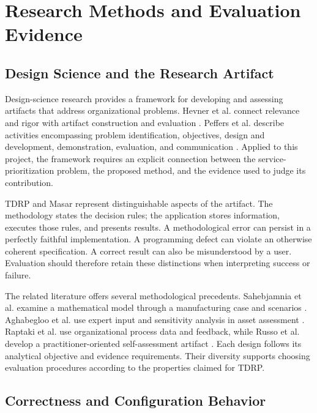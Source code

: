 \section{Research Methods and Evaluation Evidence}
\label{sec:lr_methods}

\subsection{Design Science and the Research Artifact}
\label{sec:lr_design_science}

Design-science research provides a framework for developing and assessing artifacts that address organizational problems. Hevner et al. connect relevance and rigor with artifact construction and evaluation \cite{hevner2004design}. Peffers et al. describe activities encompassing problem identification, objectives, design and development, demonstration, evaluation, and communication \cite{peffers2007dsrm}. Applied to this project, the framework requires an explicit connection between the service-prioritization problem, the proposed method, and the evidence used to judge its contribution.

TDRP and Masar represent distinguishable aspects of the artifact. The methodology states the decision rules; the application stores information, executes those rules, and presents results. A methodological error can persist in a perfectly faithful implementation. A programming defect can violate an otherwise coherent specification. A correct result can also be misunderstood by a user. Evaluation should therefore retain these distinctions when interpreting success or failure.

The related literature offers several methodological precedents. Sahebjamnia et al. examine a mathematical model through a manufacturing case and scenarios \cite{sahebjamnia2015integrated}. Aghabegloo et al. use expert input and sensitivity analysis in asset assessment \cite{assetcriticality2023}. Raptaki et al. use organizational process data and feedback, while Russo et al. develop a practitioner-oriented self-assessment artifact \cite{raptaki2025propagation,selfassessment2025}. Each design follows its analytical objective and evidence requirements. Their diversity supports choosing evaluation procedures according to the properties claimed for TDRP.

\subsection{Correctness and Configuration Behavior}
\label{sec:lr_evaluation}

